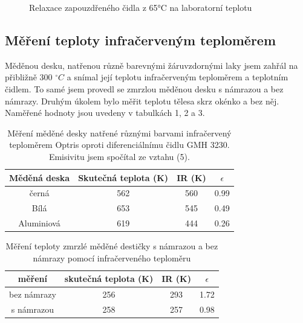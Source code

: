 \documentclass[a4paper,11pt]{article}
\begin{document}
\begin{figure}[ht]
  \centering
  
  \caption{Relaxace zapouzdřeného čidla z 65°C na laboratorní teplotu}
\end{figure}

\subsection{Měření teploty infračerveným teploměrem}

Měděnou desku, natřenou různě barevnými žáruvzdornými laky jsem zahřál na přibližně 300 $^{\circ}C$ a snímal její teplotu infračerveným teploměrem a teplotním čidlem. To samé jsem provedl se zmrzlou měděnou desku s námrazou a bez námrazy. Druhým úkolem bylo měřit teplotu tělesa skrz okénko a bez něj. Naměřené hodnoty jsou uvedeny v tabulkách 1, 2 a 3.


\begin{table}[ht]
  \centering
  \begin{tabular}{ | c | c | c | c | }
    \hline
    Měděná deska & Skutečná teplota (K) & IR (K) & $\epsilon$ \\ \hline
    černá & 562 & 560 & 0.99 \\
    Bílá & 653 & 545 & 0.49 \\
    Aluminiová & 619 & 444 & 0.26 \\ \hline
  \end{tabular}
  \captionsetup{justification=centering}
  \caption{Měření měděné desky natřené různými barvami infračervený teploměrem Optris oproti diferenciálnímu čidlu GMH 3230. 
  Emisivitu jsem spočítal ze vztahu (5).}
\end{table}

\begin{table}
  \centering
  \begin{tabular}{ | c | c | c | c | }
    \hline
    měření & skutečná teplota (K) & IR (K) & $\epsilon$ \\ \hline
    bez námrazy & 256 & 293 & 1.72   \\
    s námrazou & 258 & 257 & 0.98 \\\hline
  \end{tabular}
  \captionsetup{justification=centering}
  \caption{Měření teploty zmrzlé měděné destičky s námrazou a bez námrazy pomocí infračerveného teploměru}
\end{table}
\end{document}
